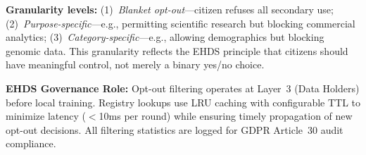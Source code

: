 \documentclass[conference,a4paper]{IEEEtran}
\begin{document}
\textbf{Granularity levels:} (1)~\textit{Blanket opt-out}---citizen refuses all secondary use; (2)~\textit{Purpose-specific}---e.g., permitting scientific research but blocking commercial analytics; (3)~\textit{Category-specific}---e.g., allowing demographics but blocking genomic data. This granularity reflects the EHDS principle that citizens should have meaningful control, not merely a binary yes/no choice.

\textbf{EHDS Governance Role:} Opt-out filtering operates at Layer~3 (Data Holders) before local training. Registry lookups use LRU caching with configurable TTL to minimize latency ($<$10ms per round) while ensuring timely propagation of new opt-out decisions. All filtering statistics are logged for GDPR Article~30 audit compliance.

\begin{figure}[htbp]
\centering
{}
\end{figure}
\end{document}
